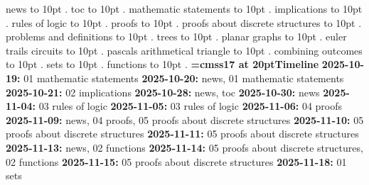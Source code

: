 
\pdfpagewidth=148mm
\pdfpageheight=210mm
\hsize=128mm
\vsize=190mm

\pdfhorigin=0pt
\pdfvorigin=0pt
\hoffset=10mm
\voffset=10mm
\noindent news \leaders\hbox to 10pt {\hss.\hss}  \hfill {}
\smallskip
\noindent toc \leaders\hbox to 10pt {\hss.\hss}  \hfill {}
\smallskip
{} mathematic statements \leaders\hbox to 10pt {\hss.\hss}  \hfill {}
\smallskip
{} implications \leaders\hbox to 10pt {\hss.\hss}  \hfill {}
\smallskip
{} rules of logic \leaders\hbox to 10pt {\hss.\hss}  \hfill {}
\smallskip
{} proofs \leaders\hbox to 10pt {\hss.\hss}  \hfill {}
\smallskip
{} proofs about discrete structures \leaders\hbox to 10pt {\hss.\hss}  \hfill {}
\smallskip
{} problems and definitions \leaders\hbox to 10pt {\hss.\hss}  \hfill {}
\smallskip
{} trees \leaders\hbox to 10pt {\hss.\hss}  \hfill {}
\smallskip
{} planar graphs \leaders\hbox to 10pt {\hss.\hss}  \hfill {}
\smallskip
{} euler trails circuits \leaders\hbox to 10pt {\hss.\hss}  \hfill {}
\smallskip
{} pascals arithmetical triangle \leaders\hbox to 10pt {\hss.\hss}  \hfill {}
\smallskip
{} combining outcomes \leaders\hbox to 10pt {\hss.\hss}  \hfill {}
\smallskip
{} sets \leaders\hbox to 10pt {\hss.\hss}  \hfill {}
\smallskip
{} functions \leaders\hbox to 10pt {\hss.\hss}  \hfill {}
\smallskip
\vfill \break
{\medskip\noindent\bf\font\titlefont=cmss17 at 20pt\titlefont Timeline}\medskip
{\noindent \bf 2025-10-19:} 01 mathematic statements\smallskip
{\noindent \bf 2025-10-20:} news, 01 mathematic statements\smallskip
{\noindent \bf 2025-10-21:} 02 implications\smallskip
{\noindent \bf 2025-10-28:} news, toc\smallskip
{\noindent \bf 2025-10-30:} news\smallskip
{\noindent \bf 2025-11-04:} 03 rules of logic\smallskip
{\noindent \bf 2025-11-05:} 03 rules of logic\smallskip
{\noindent \bf 2025-11-06:} 04 proofs\smallskip
{\noindent \bf 2025-11-09:} news, 04 proofs, 05 proofs about discrete structures\smallskip
{\noindent \bf 2025-11-10:} 05 proofs about discrete structures\smallskip
{\noindent \bf 2025-11-11:} 05 proofs about discrete structures\smallskip
{\noindent \bf 2025-11-13:} news, 02 functions\smallskip
{\noindent \bf 2025-11-14:} 05 proofs about discrete structures, 02 functions\smallskip
{\noindent \bf 2025-11-15:} 05 proofs about discrete structures\smallskip
{\noindent \bf 2025-11-18:} 01 sets\smallskip
